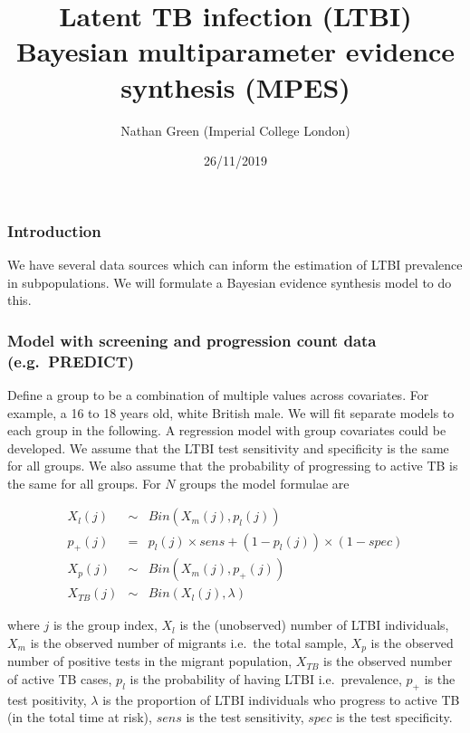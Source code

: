 \documentclass[]{article}
\title{Latent TB infection (LTBI) Bayesian multiparameter evidence synthesis
(MPES)}
\author{Nathan Green (Imperial College London)}
\date{26/11/2019}
\begin{document}
\maketitle

\hypertarget{introduction}{%
\subsubsection{Introduction}\label{introduction}}

We have several data sources which can inform the estimation of LTBI
prevalence in subpopulations. We will formulate a Bayesian evidence
synthesis model to do this.

\hypertarget{model-with-screening-and-progression-count-data-e.g.-predict}{%
\subsubsection{Model with screening and progression count data
(e.g.~PREDICT)}\label{model-with-screening-and-progression-count-data-e.g.-predict}}

Define a group to be a combination of multiple values across covariates.
For example, a 16 to 18 years old, white British male. We will fit
separate models to each group in the following. A regression model with
group covariates could be developed. We assume that the LTBI test
sensitivity and specificity is the same for all groups. We also assume
that the probability of progressing to active TB is the same for all
groups. For \(N\) groups the model formulae are

\begin{eqnarray*}
X_l(j) &\sim& Bin(X_m(j), p_l(j))\\
p_{+}(j) &=& p_l(j) \times sens + (1-p_l(j)) \times (1-spec)\\
X_p(j) &\sim& Bin(X_m(j), p_+(j))\\
X_{TB}(j) &\sim& Bin(X_l(j), \lambda)
\end{eqnarray*}

where \(j\) is the group index, \(X_l\) is the (unobserved) number of
LTBI individuals, \(X_m\) is the observed number of migrants i.e.~the
total sample, \(X_p\) is the observed number of positive tests in the
migrant population, \(X_{TB}\) is the observed number of active TB
cases, \(p_l\) is the probability of having LTBI i.e.~prevalence,
\(p_+\) is the test positivity, \(\lambda\) is the proportion of LTBI
individuals who progress to active TB (in the total time at risk),
\(sens\) is the test sensitivity, \(spec\) is the test specificity.
\end{document}

